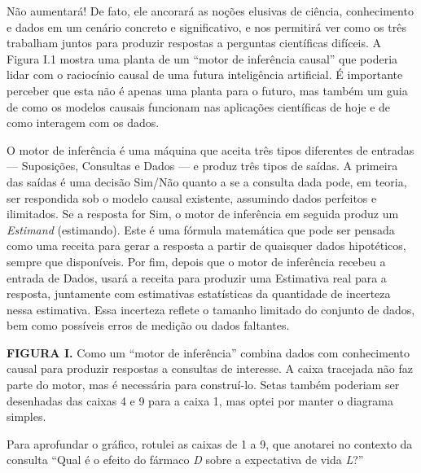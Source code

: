 \documentclass[11pt,a5paper,twoside]{book}
\begin{document}
Não aumentará! De fato, ele ancorará as noções elusivas de ciência, conhecimento e dados em um cenário concreto e significativo, e nos permitirá ver como os três trabalham juntos para produzir respostas a perguntas científicas difíceis. A Figura I.1 mostra uma planta de um “motor de inferência causal” que poderia lidar com o raciocínio causal de uma futura inteligência artificial. É importante perceber que esta não é apenas uma planta para o futuro, mas também um guia de como os modelos causais funcionam nas aplicações científicas de hoje e de como interagem com os dados.

O motor de inferência é uma máquina que aceita três tipos diferentes de entradas — Suposições, Consultas e Dados — e produz três tipos de saídas. A primeira das saídas é uma decisão Sim/Não quanto a se a consulta dada pode, em teoria, ser respondida sob o modelo causal existente, assumindo dados perfeitos e ilimitados. Se a resposta for Sim, o motor de inferência em seguida produz um \textit{Estimand} (estimando). Este é uma fórmula matemática que pode ser pensada como uma receita para gerar a resposta a partir de quaisquer dados hipotéticos, sempre que disponíveis. Por fim, depois que o motor de inferência recebeu a entrada de Dados, usará a receita para produzir uma Estimativa real para a resposta, juntamente com estimativas estatísticas da quantidade de incerteza nessa estimativa. Essa incerteza reflete o tamanho limitado do conjunto de dados, bem como possíveis erros de medição ou dados faltantes.

\textbf{FIGURA I.} Como um “motor de inferência” combina dados com conhecimento causal para produzir respostas a consultas de interesse. A caixa tracejada não faz parte do motor, mas é necessária para construí-lo. Setas também poderiam ser desenhadas das caixas 4 e 9 para a caixa 1, mas optei por manter o diagrama simples.

Para aprofundar o gráfico, rotulei as caixas de 1 a 9, que anotarei no contexto da consulta “Qual é o efeito do fármaco \textit{D} sobre a expectativa de vida \textit{L}?”
\end{document}
